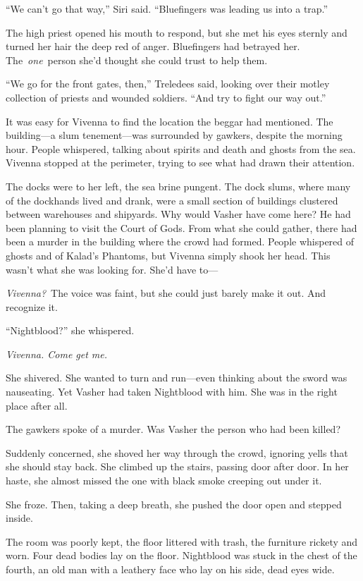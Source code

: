 “We can’t go that way,” Siri said. “Bluefingers was leading us into a trap.”

The high priest opened his mouth to respond, but she met his eyes sternly and turned her hair the deep red of anger. Bluefingers had betrayed her. The~\textit{one}~person she’d thought she could trust to help them.

“We go for the front gates, then,” Treledees said, looking over their motley collection of priests and wounded soldiers. “And try to fight our way out.”

\orn

It was easy for Vivenna to find the location the beggar had mentioned. The building—a slum tenement—was surrounded by gawkers, despite the morning hour. People whispered, talking about spirits and death and ghosts from the sea. Vivenna stopped at the perimeter, trying to see what had drawn their attention.

The docks were to her left, the sea brine pungent. The dock slums, where many of the dockhands lived and drank, were a small section of buildings clustered between warehouses and shipyards. Why would Vasher have come here? He had been planning to visit the Court of Gods. From what she could gather, there had been a murder in the building where the crowd had formed. People whispered of ghosts and of Kalad’s Phantoms, but Vivenna simply shook her head. This wasn’t what she was looking for. She’d have to—

\textit{Vivenna?}~The voice was faint, but she could just barely make it out. And recognize it.

“Nightblood?” she whispered.

\textit{Vivenna. Come get me.}

She shivered. She wanted to turn and run—even thinking about the sword was nauseating. Yet Vasher had taken Nightblood with him. She was in the right place after all.

The gawkers spoke of a murder. Was Vasher the person who had been killed?

Suddenly concerned, she shoved her way through the crowd, ignoring yells that she should stay back. She climbed up the stairs, passing door after door. In her haste, she almost missed the one with black smoke creeping out under it.

She froze. Then, taking a deep breath, she pushed the door open and stepped inside.

The room was poorly kept, the floor littered with trash, the furniture rickety and worn. Four dead bodies lay on the floor. Nightblood was stuck in the chest of the fourth, an old man with a leathery face who lay on his side, dead eyes wide.


